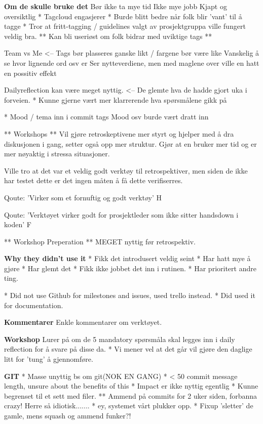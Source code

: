 \textbf{Om de skulle bruke det}
Bør ikke ta mye tid
Ikke mye jobb
Kjapt og oversiktlig
 * Tagcloud engasjerer
 * Burde blitt bedre når folk blir 'vant' til å tagge
 * Tror at fritt-tagging / guidelines valgt av prosjektgruppa ville fungert veldig bra.
 ** Kan bli useriøst om folk bidrar med uviktige tags ** 

 Team vs Me <-- Tags bør plasseres ganske likt / fargene bør være like
				Vanskelig å se hvor lignende ord osv er
				Ser nytteverdiene, men med maglene over ville en hatt en possitiv effekt

Dailyreflection kan være meget nyttig. <-- De glemte hva de hadde gjort uka i forveien.
	* Kunne gjerne vært mer klarrerende hva spørsmålene gikk på


 * Mood / tema inn i commit tags
 Mood osv burde vært dratt inn

 ** Workshops **
 Vil gjøre retroskeptivene mer styrt og hjelper med å dra diskusjonen i gang, setter også opp mer struktur.
 Gjør at en bruker mer tid og er mer nøyaktig i stressa situasjoner.

 Ville tro at det var et veldig godt verktøy til retrospektiver, men siden de ikke har testet dette er det ingen måten å få dette verifiserres.
 
 Qoute: 'Virker som et fornuftig og godt verktøy' H

 Qoute: 'Verktøyet virker godt for prosjektleder som ikke sitter handsdown i koden' F

** Workshop Preperation **
 MEGET nyttig før retrospektiv.

\textbf{Why they didn't use it}
* Fikk det introdusert veldig seint
	* Har hatt mye å gjøre
	* Har glemt det
* Fikk ikke jobbet det inn i rutinen.
* Har prioritert andre ting.


* Did not use Github for milestones and issues, used trello instead.
	* Did used it for documentation.

\textbf{Kommentarer}
Enkle kommentarer om verktøyet.

\textbf{Workshop}
Lurer på om de 5 mandatory spørsmåla skal legges inn i daily reflection for å svare på disse da.
	* Vi mener vel at det går vil gjøre den daglige litt for 'tung' å gjennomføre.


\textbf{GIT}
* Masse unyttig bs om git(NOK EN GANG)
* < 50 commit message length, unsure about the benefits of this
* Impact er ikke nyttig egentlig
	* Kunne begrenset til et sett med filer.
	** Ammend på commits for 2 uker siden, forbanna crazy! Herre så idiotisk.......
		* ey, systemet vårt plukker opp.
* Fixup 'sletter' de gamle, mens squash og ammend funker?!

